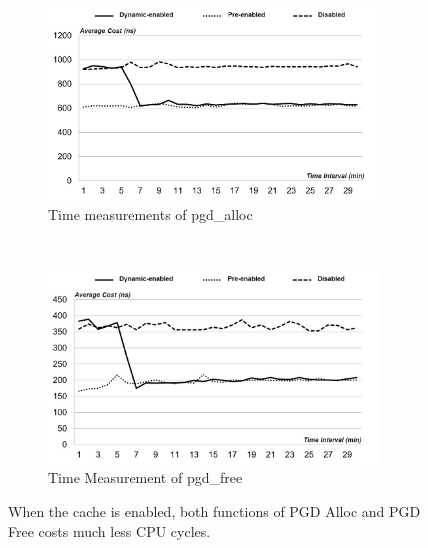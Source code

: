 \begin{figure}[t!]
    \centering
    \begin{subfigure}[t]{0.5\textwidth}
        \centering
        \includegraphics[height=2.0in]{image/micro/PGDalloc.png}
        \caption{Time measurements of pgd\_alloc}
        \label{fig:subfig:a}
    \end{subfigure}%
    ~
    \begin{subfigure}[t]{0.5\textwidth}
        \centering
        \includegraphics[height=2.0in]{image/micro/PGDfree.png}
        \caption{Time Measurement of pgd\_free}
        \label{fig:subfig:b}
    \end{subfigure}
    \caption{When the cache is enabled, both functions of PGD Alloc and PGD Free costs much less CPU cycles.}
    \label{fig:PGDtime}
\end{figure}


